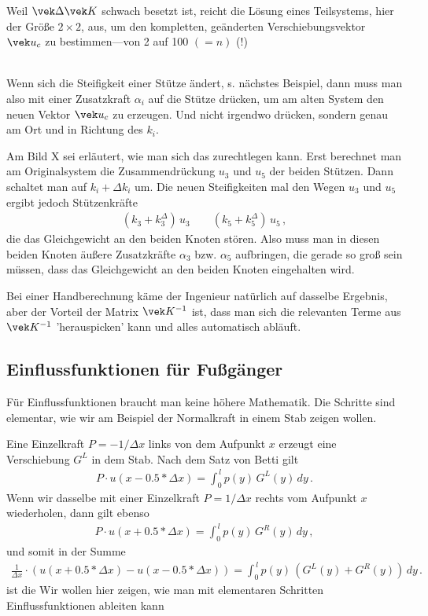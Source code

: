 {{{{{\hspace*{-12pt}\colorbox{hellgrau}{\parbox{0.98\textwidth}{
Weil $\vek \Delta \vek K$ schwach besetzt ist, reicht die L\"{o}sung eines Teilsystems, hier der Gr\"{o}{\ss}e $2 \times 2$, aus, um den kompletten, ge\"{a}nderten Verschiebungsvektor $\vek u_c$ zu bestimmen---von 2 auf 100 $(= n)$ (!)}}\\

Wenn sich die Steifigkeit einer St\"{u}tze \"{a}ndert, s. n\"{a}chstes Beispiel, dann muss man also mit einer Zusatzkraft $\alpha_i$ auf die St\"{u}tze dr\"{u}cken, um am alten System den neuen Vektor $\vek u_c$ zu erzeugen. Und nicht irgendwo dr\"{u}cken, sondern genau am Ort und in Richtung des $k_i$.

Am Bild X sei erl\"{a}utert, wie man sich das zurechtlegen kann. Erst berechnet man am Originalsystem die Zusammendr\"{u}ckung $u_3$ und $u_5$ der beiden St\"{u}tzen. Dann schaltet man auf $k_i + \Delta k_i$ um. Die neuen Steifigkeiten mal den Wegen $u_3$ und $u_5$ ergibt jedoch St\"{u}tzenkr\"{a}fte
\begin{align}
(k_3 + k^\Delta_3) \, u_3 \qquad (k_5 + k^\Delta_5) \, u_5\,,
\end{align}
die das Gleichgewicht an den beiden Knoten st\"{o}ren. Also muss man in diesen beiden Knoten \"{a}u{\ss}ere Zusatzkr\"{a}fte $\alpha_3$ bzw. $\alpha_5$ aufbringen, die gerade so gro{\ss} sein m\"{u}ssen, dass das Gleichgewicht an den beiden Knoten eingehalten wird.

Bei einer Handberechnung k\"{a}me der Ingenieur nat\"{u}rlich auf dasselbe Ergebnis, aber der Vorteil der Matrix $\vek K^{-1}$ ist, dass man sich die relevanten Terme aus $\vek K^{-1}$ 'herauspicken' kann und alles automatisch abl\"{a}uft.


\textcolor{blau2}{\section{Einflussfunktionen f\"{u}r Fu{\ss}g\"{a}nger}}
F\"{u}r Einflussfunktionen braucht man keine h\"{o}here Mathematik. Die Schritte sind elementar, wie wir am Beispiel der Normalkraft in einem Stab zeigen wollen.

Eine Einzelkraft $P = -1/\Delta x $ links von dem Aufpunkt $x$ erzeugt eine Verschiebung $G^L$ in dem Stab. Nach dem Satz von Betti gilt
\begin{align}
P \cdot u(x - 0.5 * \Delta x) = \int_0^{\,l} p(y)\,G^L(y)\,dy\,.
\end{align}
Wenn wir dasselbe mit einer Einzelkraft $P = 1/\Delta x $ rechts vom Aufpunkt $x $ wiederholen, dann gilt ebenso
\begin{align}
P \cdot u(x + 0.5 * \Delta x) = \int_0^{\,l} p(y)\,G^R(y)\,dy\,,
\end{align}
und somit in der Summe
\begin{align}
\frac{1}{\Delta x} \cdot (u(x + 0.5 * \Delta x) - u(x - 0.5 * \Delta x)) = \int_0^{\,l} p(y)\,(G^L(y) + G^R(y))\,dy\,.
\end{align}
ist die Wir wollen hier zeigen, wie man mit elementaren Schritten Einflussfunktionen ableiten kann

}}}}}
